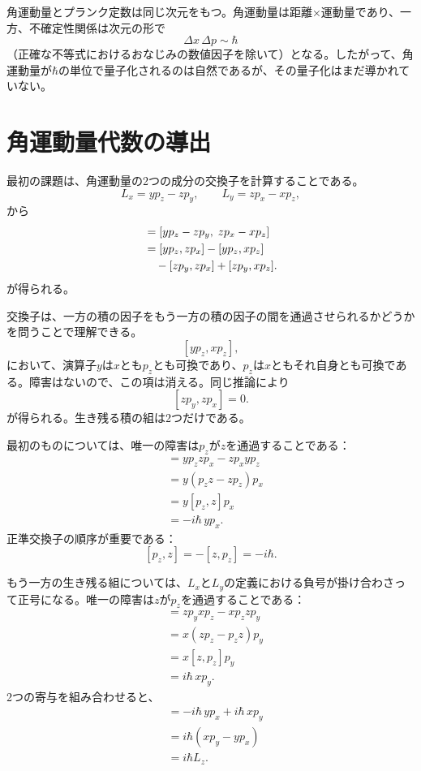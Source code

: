 角運動量とプランク定数は同じ次元をもつ。角運動量は距離×運動量であり、一方、不確定性関係は次元の形で
\begin{equation}
\Delta x\,\Delta p\sim\hbar
\end{equation}
（正確な不等式におけるおなじみの数値因子を除いて）となる。したがって、角運動量が\(\hbar\)の単位で量子化されるのは自然であるが、その量子化はまだ導かれていない。

\section{角運動量代数の導出}

最初の課題は、角運動量の2つの成分の交換子を計算することである。
\[
L_x=yp_z-zp_y,\qquad
L_y=zp_x-xp_z,
\]
から
\begin{align}
[L_x,L_y]
&=[yp_z-zp_y,\;zp_x-xp_z] \\
&=[yp_z,zp_x]-[yp_z,xp_z] \notag\\
&\quad{}-[zp_y,zp_x]+[zp_y,xp_z].
\end{align}
が得られる。

\begin{classroomqa}
\end{classroomqa}

交換子は、一方の積の因子をもう一方の積の因子の間を通過させられるかどうかを問うことで理解できる。
\[
[yp_z,xp_z],
\]
において、演算子\(y\)は\(x\)とも\(p_z\)とも可換であり、\(p_z\)は\(x\)ともそれ自身とも可換である。障害はないので、この項は消える。同じ推論により
\[
[zp_y,zp_x]=0.
\]
が得られる。生き残る積の組は2つだけである。

最初のものについては、唯一の障害は\(p_z\)が\(z\)を通過することである：
\begin{align}
[yp_z,zp_x]
&=yp_zzp_x-zp_xyp_z \\
&=y(p_zz-zp_z)p_x \\
&=y[p_z,z]p_x \\
&=-i\hbar\,yp_x.
\end{align}
正準交換子の順序が重要である：
\[
[p_z,z]=-[z,p_z]=-i\hbar.
\]

もう一方の生き残る組については、\(L_x\)と\(L_y\)の定義における負号が掛け合わさって正号になる。唯一の障害は\(z\)が\(p_z\)を通過することである：
\begin{align}
[zp_y,xp_z]
&=zp_yxp_z-xp_zzp_y \\
&=x(zp_z-p_zz)p_y \\
&=x[z,p_z]p_y \\
&=i\hbar\,xp_y.
\end{align}
2つの寄与を組み合わせると、
\begin{align}
[L_x,L_y]
&=-i\hbar\,yp_x+i\hbar\,xp_y \\
&=i\hbar(xp_y-yp_x) \\
&=i\hbar L_z.
\end{align}

